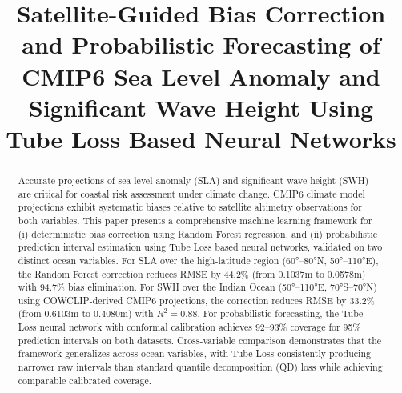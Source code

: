 \documentclass[conference]{IEEEtran}
\begin{document}
\title{Satellite-Guided Bias Correction and Probabilistic Forecasting of CMIP6 Sea Level Anomaly and Significant Wave Height Using Tube Loss Based Neural Networks}

\author{
\and
{}
\and
{}
}

\maketitle

\begin{abstract}
Accurate projections of sea level anomaly (SLA) and significant wave height (SWH) are critical for coastal risk assessment under climate change. CMIP6 climate model projections exhibit systematic biases relative to satellite altimetry observations for both variables. This paper presents a comprehensive machine learning framework for (i) deterministic bias correction using Random Forest regression, and (ii) probabilistic prediction interval estimation using Tube Loss based neural networks, validated on two distinct ocean variables. For SLA over the high-latitude region (60°--80°N, 50°--110°E), the Random Forest correction reduces RMSE by 44.2\% (from 0.1037m to 0.0578m) with 94.7\% bias elimination. For SWH over the Indian Ocean (50°--110°E, 70°S--70°N) using COWCLIP-derived CMIP6 projections, the correction reduces RMSE by 33.2\% (from 0.6103m to 0.4080m) with $R^2=0.88$. For probabilistic forecasting, the Tube Loss neural network with conformal calibration achieves 92--93\% coverage for 95\% prediction intervals on both datasets. Cross-variable comparison demonstrates that the framework generalizes across ocean variables, with Tube Loss consistently producing narrower raw intervals than standard quantile decomposition (QD) loss while achieving comparable calibrated coverage.
\end{abstract}
\end{document}
